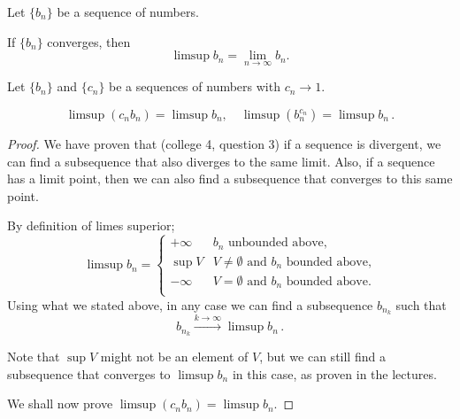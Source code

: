 \documentclass[week=11]{homework}
\date{\today}
\begin{document}
    \maketitle
    \thispagestyle{empty}
    \newpage
    \begin{questions}
		\let\firstquestion\question
		\renewcommand*{\question}{\vspace{7mm}\firstquestion}
        \firstquestion
		Let $\{b_n \}$ be a sequence of numbers. 
		\begin{toprove}
			If $\{b_n \}$ converges, then 
			\[
				\limsup b_n = \lim_{n \to \infty} b_n.
			\]
		\end{toprove}
		
		\question
		Let $\{b_n \}$ and $\{c_n \}$ be a sequences of numbers with $c_n \to 1$. 
		\begin{toprove}
			\[
				\limsup (c_n b_n) = \limsup b_n, \quad \limsup (b_n^{c_n}) = \limsup b_n\,.
			\]
		\end{toprove}
		\begin{proof}
			We have proven that (college 4, question 3) if a sequence is divergent, we can find a subsequence that also diverges to the same limit. Also, if a sequence has a limit point, then we can also find a subsequence that converges to this same point.
			
			By definition of limes superior;
			\[
				\limsup b_n = 
				\begin{cases}
					+\infty & b_n \text{ unbounded above,} \\
					\sup V & V \neq \emptyset \text{ and } b_n \text{ bounded above,} \\
					-\infty & V = \emptyset \text{ and } b_n \text{ bounded above.} \\
				\end{cases}
			\]
			Using what we stated above, in any case we can find a subsequence $b_{n_k}$ such that
			\begin{equation} \label{subsequence_to_limsup} \tag{$\star$}
				b_{n_k} \xrightarrow{k\to\infty} \limsup b_n\,.
			\end{equation}
			
			Note that $\sup V$ might not be an element of $V$, but we can still find a subsequence that converges to $\limsup b_n$ in this case, as proven in the lectures.
			
			We shall now prove $\limsup (c_n b_n) = \limsup b_n$.
\end{proof}
\end{questions}
\end{document}
